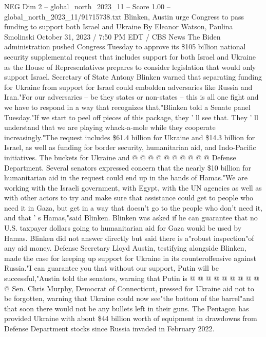 \begin{textsample}{NEG Dim 2 – global\_north\_2023\_11 – Score 1.00 – global\_north\_2023\_11/91715738.txt}  \label{ex:f2_neg_137}
Blinken, Austin urge Congress to pass funding to support both Israel and Ukraine By Eleanor Watson, Paulina Smolinski October 31, 2023 / 7:50 PM EDT / CBS News The Biden administration pushed Congress Tuesday to approve its \$105 billion national security supplemental request that includes support for both Israel and Ukraine as the House of Representatives prepares to consider legislation that would only support Israel.
Secretary of State Antony Blinken warned that separating funding for Ukraine from support for Israel could embolden adversaries like Russia and Iran."For our adversaries -- be they states or non-states -- this is all one fight and we have to respond in a way that recognizes that,"Blinken told a Senate panel Tuesday."If we start to peel off pieces of this package, they ' ll see that.
They ' ll understand that we are playing whack-a-mole while they cooperate increasingly."The request includes \$61.4 billion for Ukraine and \$14.3 billion for Israel, as well as funding for border security, humanitarian aid, and Indo-Pacific initiatives.
The buckets for Ukraine and @ @ @ @ @ @ @ @ @ @ Defense Department.
Several senators expressed concern that the nearly \$10 billion for humanitarian aid in the request could end up in the hands of Hamas."We are working with the Israeli government, with Egypt, with the UN agencies as well as with other actors to try and make sure that assistance could get to people who need it in Gaza, but get in a way that doesn't go to the people who don't need it, and that ' s Hamas,"said Blinken.
Blinken was asked if he can guarantee that no U.S. taxpayer dollars going to humanitarian aid for Gaza would be used by Hamas.
Blinken did not answer directly but said there is a"robust inspection"of any aid money.
Defense Secretary Lloyd Austin, testifying alongside Blinken, made the case for keeping up support for Ukraine in its counteroffensive against Russia."I can guarantee you that without our support, Putin will be successful,"Austin told the senators, warning that Putin is @ @ @ @ @ @ @ @ @ @ Sen.
Chris Murphy, Democrat of Connecticut, pressed for Ukraine aid not to be forgotten, warning that Ukraine could now see"the bottom of the barrel"and that soon there would not be any bullets left in their guns.
The Pentagon has provided Ukraine with about \$44 billion worth of equipment in drawdowns from Defense Department stocks since Russia invaded in February 2022.

\end{textsample}
